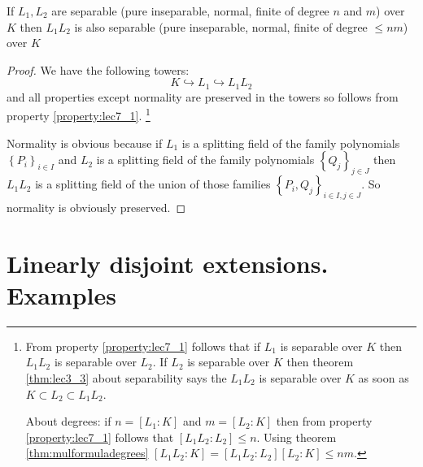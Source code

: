 \begin{property}
  If $L_1, L_2$ are separable (pure inseparable, normal, finite of
  degree $n$ and $m$) over $K$ then $L_1 L_2$ is also separable (pure
  inseparable, normal, finite of degree $ \le n m $) over $K$
  \begin{proof}
    We have the following towers:
    \[
    K \hookrightarrow L_1 \hookrightarrow L_1 L_2
    \]
    and all properties except normality are preserved in the towers
    so
    follows from property \ref{property:lec7_1}.
    \footnote{
      From property \ref{property:lec7_1} follows that if $L_1$ is
      separable over $K$ then $L_1 L_2$ is separable over 
      $L_2$. If $L_2$ is separable over $K$ then theorem
      \ref{thm:lec3_3} about separability says the $L_1 L_2$ is
      separable over $K$ as soon as $K \subset L_2 \subset L_1 L_2$.

      About degrees: if $n = \left[L_1 : K\right]$ and
      $m = \left[L_2 : K\right]$ then from property
      \ref{property:lec7_1} follows that
      $\left[L_1 L_2 : L_2\right] \le n$. Using theorem
      \ref{thm:mulformuladegrees}
      $\left[L_1 L_2 : K\right]  = \left[L_1 L_2 : L_2\right] \left[
        L_2 : K\right]\le nm$.
    }

    
    Normality is obvious because if $L_1$ is a splitting field of the
    family polynomials $\left\{P_i\right\}_{i \in I}$
    and $L_2$ is a splitting field of the
    family polynomials $\left\{Q_j\right\}_{j \in J}$ then
    $L_1 L_2$ is a splitting field of the union of those families
    $\left\{P_i, Q_j\right\}_{i \in I, j \in J}$. So normality is
    obviously preserved.  
  \end{proof}
  \label{property:lec7_2}
\end{property}


\section{Linearly disjoint extensions. Examples}

